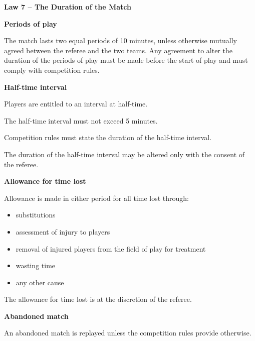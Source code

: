 \clearpage
\sffamily
{\bfseries\color[rgb]{0.4,0.4,0.4}
Law 7 -- The Duration of the Match}
{}

\bigskip

{\bfseries Periods of play }

\headlinebox

The match lasts two equal periods of 10 minutes,
unless otherwise mutually agreed between the referee and the two teams.
Any agreement to alter the duration of the periods of play must be made before
the start of play and must comply with competition rules.

\bigskip

{\bfseries Half-time interval}

\headlinebox

Players are entitled to an interval at half-time.

The half-time interval must not exceed 5 minutes.

Competition rules must state the duration of the half-time interval.

The duration of the half-time interval may be altered only with the consent of the referee. 

\bigskip

{\bfseries Allowance for time lost}

\headlinebox

Allowance is made in either period for all time lost through: 

\begin{itemize}
\item substitutions
\item assessment of injury to players
\item removal of injured players from the field of play for treatment 
\item wasting time
\item any other cause
\end{itemize}

The allowance for time lost is at the discretion of the referee.

\bigskip

{\bfseries {}}

\headlinebox

\bigskip

{\sffamily
\textbf{Abandoned match} }

\headlinebox

An abandoned match is replayed unless the competition rules provide otherwise.
